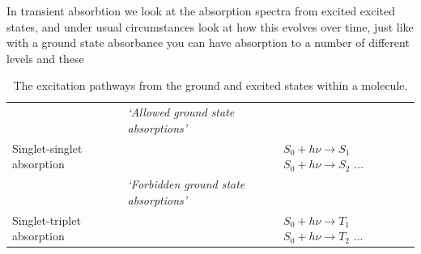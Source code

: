 \documentclass[
]{book}
\begin{document}
In transient absorbtion we look at the absorption spectra from excited excited states, and under usual circumstances look at how this evolves over time, just like with a ground state absorbance you can have absorption to a number of different levels and these

\begin{longtable}[]{@{}lll@{}}
\caption{\label{tab:phototrans} The excitation pathways from the ground and excited states within a molecule.}\tabularnewline
\toprule
\endhead
\begin{minipage}[t]{0.35\columnwidth}\raggedright
\strut
\end{minipage} & \begin{minipage}[t]{0.33\columnwidth}\raggedright
\emph{`Allowed ground state absorptions'}\strut
\end{minipage} & \begin{minipage}[t]{0.23\columnwidth}\raggedright
\strut
\end{minipage}\tabularnewline
\begin{minipage}[t]{0.35\columnwidth}\raggedright
Singlet-singlet absorption\strut
\end{minipage} & \begin{minipage}[t]{0.33\columnwidth}\raggedright
\strut
\end{minipage} & \begin{minipage}[t]{0.23\columnwidth}\raggedright
\(S_0 + h \nu \longrightarrow S_1\) \(S_0 + h \nu \longrightarrow S_2\) \(\dots\)\strut
\end{minipage}\tabularnewline
\begin{minipage}[t]{0.35\columnwidth}\raggedright
\strut
\end{minipage} & \begin{minipage}[t]{0.33\columnwidth}\raggedright
\emph{`Forbidden ground state absorptions'}\strut
\end{minipage} & \begin{minipage}[t]{0.23\columnwidth}\raggedright
\strut
\end{minipage}\tabularnewline
\begin{minipage}[t]{0.35\columnwidth}\raggedright
Singlet-triplet absorption\strut
\end{minipage} & \begin{minipage}[t]{0.33\columnwidth}\raggedright
\strut
\end{minipage} & \begin{minipage}[t]{0.23\columnwidth}\raggedright
\(S_0 + h \nu \longrightarrow T_1\) \(S_0 + h \nu \longrightarrow T_2\) \(\dots\)\strut

\end{minipage}
\end{longtable}
\end{document}
